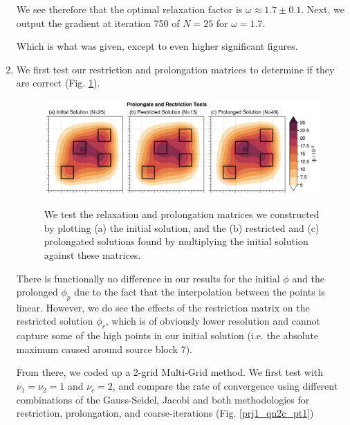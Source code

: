 \begin{enumerate}[label=(\roman*),leftmargin=*,itemsep=0mm]
    We see therefore that the optimal relaxation factor is $\omega \approx 1.7 \pm 0.1$.  Next, we output the gradient at iteration 750 of $N=25$ for $\omega=1.7$.
    
    
    
    Which is what was given, except to even higher significant figures.
    
    \item We first test our restriction and prolongation matrices to determine if they are correct (Fig. \ref{prj1_qn2c_testrestrictprolong}).

    \begin{figure}[h!]
    \centering
    \includegraphics[width=\textwidth]{figures/prj1_qn2c_testrestrictprolong.png}\\
    \caption{We test the relaxation and prolongation matrices we constructed by plotting (a) the initial solution, and the (b) restricted and (c) prolongated solutions found by multiplying the initial solution against these matrices.}
    \label{prj1_qn2c_testrestrictprolong}
    \end{figure}
    
    There is functionally no difference in our results for the initial $\phi$ and the prolonged $\phi_p$ due to the fact that the interpolation between the points is linear.  However, we do see the effects of the restriction matrix on the restricted solution $\phi_r$, which is of obviously lower resolution and cannot capture some of the high points in our initial solution (i.e. the absolute maximum caused around source block 7).
    
    From there, we coded up a 2-grid Multi-Grid method.  We first test with $\nu_1=\nu_2=1$ and $\nu_c=2$, and compare the rate of convergence using different combinations of the Gauss-Seidel, Jacobi and both methodologies for restriction, prolongation, and coarse-iterations (Fig. \ref{prj1_qn2c_pt1})


\end{enumerate}
